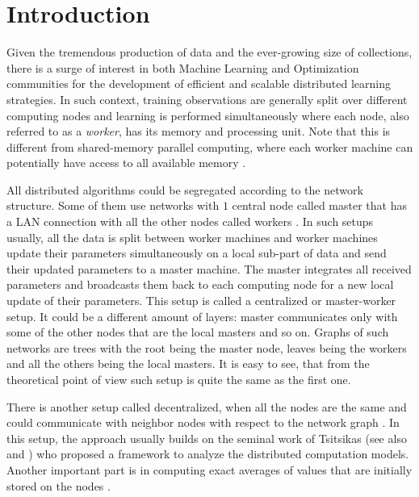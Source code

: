 \section{Introduction}\label{sec:distributed-intro}

Given the tremendous production of data and the ever-growing size of collections, there is a surge of interest in both Machine Learning and Optimization communities for the development of efficient and scalable distributed learning strategies. In such context, training observations are generally split over different computing nodes and learning is performed simultaneously where each node, also referred to as a \textit{worker}, has its memory and processing unit.  Note that this is different from shared-memory parallel computing, where each worker machine can potentially have access to all available memory \cite{Leslie91, Kumar02}. 

All distributed algorithms could be segregated according to the network structure. Some of them use networks with $1$ central node called master that has a LAN connection with all the other nodes called workers \cite{konevcny2016federated,konevcny2016federated2,mishchenko2018}. In such setups usually, all the data is split between worker machines and worker machines update their parameters simultaneously on a local sub-part of data and send their updated parameters to a master machine. The master integrates all received parameters and broadcasts them back to each computing node for a new local update of their parameters. This setup is called a centralized or master-worker setup. It could be a different amount of layers: master communicates only with some of the other nodes that are the local masters and so on. Graphs of such networks are trees with the root being the master node, leaves being the workers and all the others being the local masters. It is easy to see, that from the theoretical point of view such setup is quite the same as the first one.

There is another setup called decentralized, when all the nodes are the same and could communicate with neighbor nodes with respect to the network graph \cite{nedic2009distributed, boyd2011distributed, duchi2011dual, shi2015extra}. In this setup, the approach usually builds on the seminal work of Tsitsikas \cite{tsitsiklis1984problems} (see also \cite{bertsekas1997parallel} and \cite{tsitsiklis1986distributed}) who proposed a framework to analyze the distributed computation models. Another important part is in computing exact averages of values that are initially stored on the nodes \cite{boyd2011distributed, olshevsky2006convergence,olshevsky2009convergence}. 

